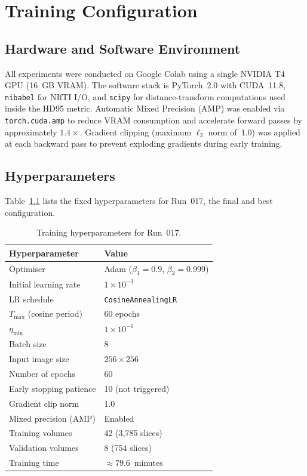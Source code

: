\chapter{Training Configuration}
\label{chap:train}

\section{Hardware and Software Environment}

All experiments were conducted on Google Colab using a single NVIDIA T4 GPU (16~GB VRAM).
The software stack is PyTorch~2.0 with CUDA~11.8, \texttt{nibabel} for NIfTI I/O, and
\texttt{scipy} for distance-transform computations used inside the HD95 metric. Automatic Mixed Precision (AMP) was
enabled via \texttt{torch.cuda.amp} to reduce VRAM consumption and accelerate forward passes
by approximately $1.4\times$. Gradient clipping (maximum $\ell_2$ norm of~$1.0$) was applied
at each backward pass to prevent exploding gradients during early training.

\section{Hyperparameters}

Table~\ref{tab:hyperparams} lists the fixed hyperparameters for Run~017, the final and best
configuration.

\begin{table}[h!]
\centering
\caption{Training hyperparameters for Run~017.}
\label{tab:hyperparams}
\begin{tabular}{ll}
\toprule
\textbf{Hyperparameter} & \textbf{Value} \\
\midrule
Optimiser               & Adam ($\beta_1 = 0.9$, $\beta_2 = 0.999$) \\
Initial learning rate   & $1 \times 10^{-3}$ \\
LR schedule             & \texttt{CosineAnnealingLR} \\
$T_{\max}$ (cosine period) & 60 epochs \\
$\eta_{\min}$           & $1 \times 10^{-6}$ \\
Batch size              & 8 \\
Input image size        & $256 \times 256$ \\
Number of epochs        & 60 \\
Early stopping patience & 10 (not triggered) \\
Gradient clip norm      & 1.0 \\
Mixed precision (AMP)   & Enabled \\
Training volumes        & 42 (3{,}785 slices) \\
Validation volumes      & 8 (754 slices) \\
Training time           & $\approx 79.6$~minutes \\
\bottomrule
\end{tabular}
\end{table}

